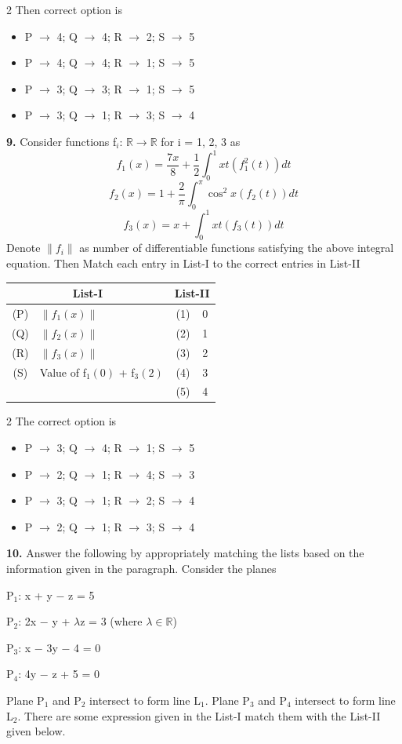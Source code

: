 \documentclass[10pt]{extarticle}
\newenvironment{qoptions}{\begin{itemize}[leftmargin=1.8em,itemsep=2pt,topsep=2pt,label={}]}{\end{itemize}}
\newcommand{\opt}[2]{\item[({#1})] {#2}}
\begin{document}
\begin{multicols}{2}
Then correct option is

\begin{qoptions}
\opt{A}{P $\to$ 4; Q $\to$ 4; R $\to$ 2; S $\to$ 5}
\opt{B}{P $\to$ 4; Q $\to$ 4; R $\to$ 1; S $\to$ 5}
\opt{C}{P $\to$ 3; Q $\to$ 3; R $\to$ 1; S $\to$ 5}
\opt{D}{P $\to$ 3; Q $\to$ 1; R $\to$ 3; S $\to$ 4}
\end{qoptions}

\textbf{9.} Consider functions f$_i$: $\mathbb R\to\mathbb R$ for i = 1, 2, 3 as
$$f_1(x)=\dfrac{7x}8+\dfrac12\int_0^1xt\left(f_1^2(t)\right)dt$$
$$f_2(x)=1+\dfrac2\pi\int_0^\pi\cos^2x(f_2(t))dt$$
$$f_3(x)=x+\int_0^1xt(f_3(t))dt$$
Denote $\|f_i\|$ as number of differentiable functions satisfying the above integral equation. Then Match each entry in List-I to the correct entries in List-II

\end{multicols}

\begin{center}
\begin{tabular}{|c|l|c|l|}
\hline
\multicolumn{2}{|c|}{\textbf{List-I}} & \multicolumn{2}{c|}{\textbf{List-II}} \\
\hline
(P) & $\|f_1(x)\|$ & (1) & 0 \\
\hline
(Q) & $\|f_2(x)\|$ & (2) & 1 \\
\hline
(R) & $\|f_3(x)\|$ & (3) & 2 \\
\hline
(S) & Value of f$_1(0)$ + f$_3(2)$ & (4) & 3 \\
\hline
 & & (5) & 4 \\
\hline
\end{tabular}
\end{center}

\begin{multicols}{2}
The correct option is

\begin{qoptions}
\opt{A}{P $\to$ 3; Q $\to$ 4; R $\to$ 1; S $\to$ 5}
\opt{B}{P $\to$ 2; Q $\to$ 1; R $\to$ 4; S $\to$ 3}
\opt{C}{P $\to$ 3; Q $\to$ 1; R $\to$ 2; S $\to$ 4}
\opt{D}{P $\to$ 2; Q $\to$ 1; R $\to$ 3; S $\to$ 4}
\end{qoptions}

\textbf{10.} Answer the following by appropriately matching the lists based on the information given in the paragraph. Consider the planes

P$_1$: x + y $-$ z = 5

P$_2$: 2x $-$ y + $\lambda$z = 3 (where $\lambda\in\mathbb R$)

P$_3$: x $-$ 3y $-$ 4 = 0

P$_4$: 4y $-$ z + 5 = 0

Plane P$_1$ and P$_2$ intersect to form line L$_1$. Plane P$_3$ and P$_4$ intersect to form line L$_2$. There are some expression given in the List-I match them with the List-II given below.

\end{multicols}
\end{document}
